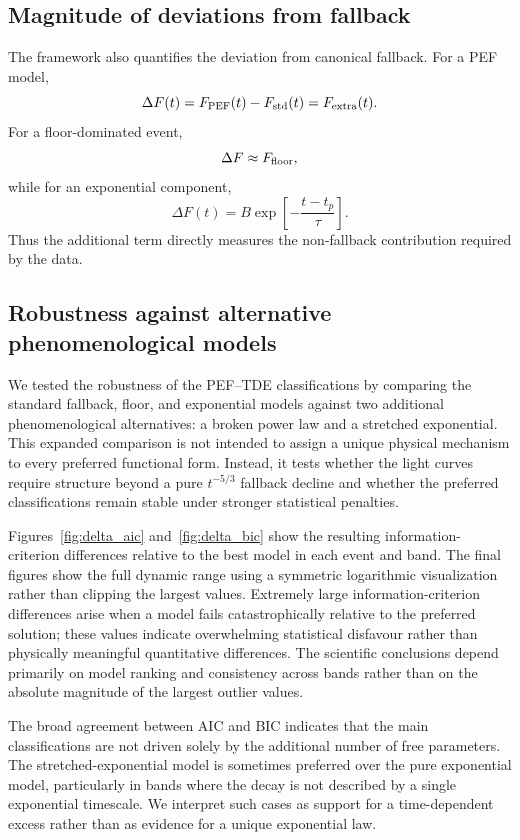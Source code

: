 \documentclass[11pt]{article}
\begin{document}
\subsection{Magnitude of deviations from fallback}
The framework also quantifies the deviation from canonical fallback. For a PEF model,
\begin{equation}
\Delta F(t)=F_{\rm PEF}(t)-F_{\rm std}(t)=F_{\rm extra}(t).
\end{equation}
For a floor-dominated event,
\begin{equation}
\Delta F\approx F_{\rm floor},
\end{equation}
while for an exponential component,
\begin{equation}
\Delta F(t)=B\exp\left[-\frac{t-t_p}{\tau}\right].
\end{equation}
Thus the additional term directly measures the non-fallback contribution required by the data.

\subsection{Robustness against alternative phenomenological models}
\label{subsec:robustness_results}
We tested the robustness of the PEF--TDE classifications by comparing the standard fallback, floor, and exponential models against two additional phenomenological alternatives: a broken power law and a stretched exponential. This expanded comparison is not intended to assign a unique physical mechanism to every preferred functional form. Instead, it tests whether the light curves require structure beyond a pure $t^{-5/3}$ fallback decline and whether the preferred classifications remain stable under stronger statistical penalties.

Figures~\ref{fig:delta_aic} and~\ref{fig:delta_bic} show the resulting information-criterion differences relative to the best model in each event and band. The final figures show the full dynamic range using a symmetric logarithmic visualization rather than clipping the largest values. Extremely large information-criterion differences arise when a model fails catastrophically relative to the preferred solution; these values indicate overwhelming statistical disfavour rather than physically meaningful quantitative differences. The scientific conclusions depend primarily on model ranking and consistency across bands rather than on the absolute magnitude of the largest outlier values.

The broad agreement between AIC and BIC indicates that the main classifications are not driven solely by the additional number of free parameters. The stretched-exponential model is sometimes preferred over the pure exponential model, particularly in bands where the decay is not described by a single exponential timescale. We interpret such cases as support for a time-dependent excess rather than as evidence for a unique exponential law.
\end{document}
